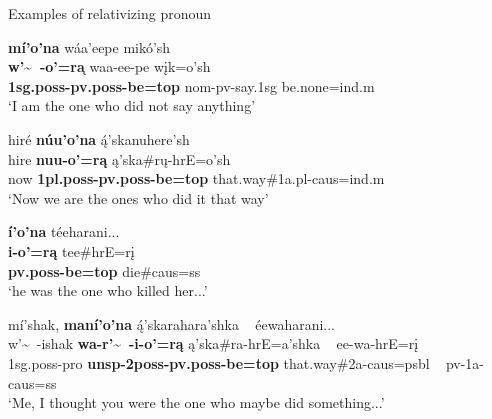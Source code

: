 \begin{exe}

\item\label{ExamplesOfRelativizingPronoun} Examples of relativizing pronoun

    \begin{xlist}
    
    \item\label{ExamplesOfRelativizingPronoun1} \glll \textbf{mí'o'na} wáa'eepe mikó'sh\\
    \textbf{w'\~~-o'=ra}̨ waa-ee-pe wįk=o'sh\\
    \textbf{1sg.poss-pv.poss-\textnormal{\bfseries be}=top} nom-pv-\textnormal{say}.1sg \textnormal{be.none}=ind.m\\
    \glt `I am the one who did not say anything' \citep[244]{hollow1973b}
    
    \item\label{ExamplesOfRelativizingPronoun2} \glll hiré \textbf{núu'o'na} ą́'skanuhere'sh\\
    hire \textbf{nuu-o'=rą} ą'ska\#rų-hrE=o'sh\\
    \textnormal{now} \textbf{1pl.poss-pv.poss-\textnormal{\bfseries be}=top} \textnormal{that.way}\#1a.pl-caus=ind.m\\
    \glt `Now we are the ones who did it that way' \citep[176]{hollow1973b}
    
    \item\label{ExamplesOfRelativizingPronoun3} \glll \textbf{í'o'na} téeharani...\\
    \textbf{i-o'=rą} tee\#hrE=rį\\
    \textbf{pv.poss-\textnormal{\bfseries be}=top} \textnormal{die}\#caus=ss\\
    \glt `he was the one who killed her...' \citep[178]{hollow1973a}
    
    \item\label{ExamplesOfRelativizingPronoun4} \glll mí'shak, \textbf{maní'o'na} ą́'skarahara'shka ~  éewaharani...\\
    w'\~~-ishak \textbf{wa-r'\~~-i-o'=rą} ą'ska\#ra-hrE=a'shka ~  ee-wa-hrE=rį\\
    1sg.poss-pro \textbf{unsp-2poss-pv.poss-\textnormal{\bfseries be}=top} \textnormal{that.way}\#2a-caus=psbl ~ pv-1a-caus=ss\\
    \glt `Me, I thought you were the one who maybe did something...' \citep[238]{hollow1973b}

    \end{xlist}

\end{exe}

